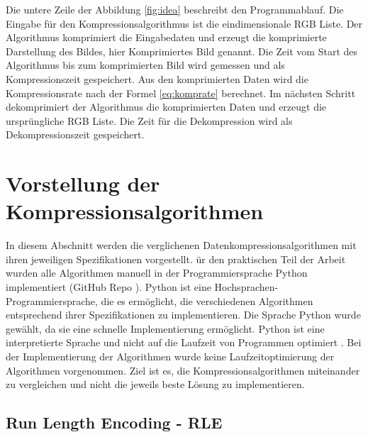 \documentclass[conference]{IEEEtran}
\begin{document}
Die untere Zeile der Abbildung \ref{fig:idea} beschreibt den Programmablauf. 
Die Eingabe für den Kompressionsalgorithmus ist die eindimensionale RGB Liste. 
Der Algorithmus komprimiert die Eingabedaten und erzeugt die komprimierte 
Darstellung des Bildes, hier Komprimiertes Bild genannt. 
Die Zeit vom Start des Algorithmus bis zum komprimierten Bild wird gemessen 
und als Kompressionszeit gespeichert. 
Aus den komprimierten Daten wird die Kompressionsrate nach der 
Formel \ref{eq:komprate} berechnet. 
Im nächsten Schritt dekomprimiert der Algorithmus die komprimierten Daten 
und erzeugt die ursprüngliche RGB Liste. 
Die Zeit für die Dekompression wird als Dekompressionszeit gespeichert.



\section{Vorstellung der Kompressionsalgorithmen}

In diesem Abschnitt werden die verglichenen Datenkompressionsalgorithmen
mit ihren jeweiligen Spezifikationen vorgestellt.
ür den praktischen Teil der Arbeit wurden alle Algorithmen manuell in der 
Programmiersprache Python implementiert (GitHub Repo \cite{nick}).
Python ist eine Hochsprachen-Programmiersprache, die es ermöglicht,
die verschiedenen Algorithmen entsprechend ihrer Spezifikationen zu implementieren.
Die Sprache Python wurde gewählt, da sie eine schnelle Implementierung ermöglicht.
Python ist eine interpretierte Sprache und nicht auf die Laufzeit von Programmen
optimiert \cite{nadav}. 
Bei der Implementierung der Algorithmen wurde keine Laufzeitoptimierung der 
Algorithmen vorgenommen. 
Ziel ist es, die Kompressionsalgorithmen miteinander zu vergleichen und nicht die 
jeweils beste Lösung zu implementieren. 


\subsection{Run Length Encoding - RLE}
\end{document}
